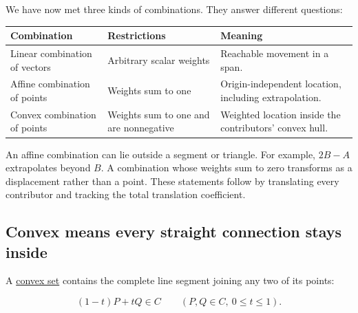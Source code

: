 We have now met three kinds of combinations. They answer different questions:

{\def\LTcaptype{none} %
\begin{longtable}[]{@{}
  >{\raggedright\arraybackslash}p{}
  >{\raggedright\arraybackslash}p{}
  >{\raggedright\arraybackslash}p{}@{}}
\toprule\noalign{}
\begin{minipage}[b]{\linewidth}\raggedright
Combination
\end{minipage} & \begin{minipage}[b]{\linewidth}\raggedright
Restrictions
\end{minipage} & \begin{minipage}[b]{\linewidth}\raggedright
Meaning
\end{minipage} \\
\midrule\noalign{}
\endhead
\bottomrule\noalign{}
\endlastfoot
Linear combination of vectors & Arbitrary scalar weights & Reachable movement in a span. \\
Affine combination of points & Weights sum to one & Origin-independent location, including extrapolation. \\
Convex combination of points & Weights sum to one and are nonnegative & Weighted location inside the contributors' convex hull. \\
\end{longtable}
}

An affine combination can lie outside a segment or triangle. For example, \(2B-A\) extrapolates beyond \(B\). A combination whose weights sum to zero transforms as a displacement rather than a point. These statements follow by translating every contributor and tracking the total translation coefficient.

\subsection{Convex means every straight connection stays inside}\label{01-foundations-i-ch018-convex-means-every-straight-connection-stays-inside}

A \hyperref[01-foundations-i-ch018-weighted-points-lead-from-affine-geometry-to-collision-shapes]{convex set} contains the complete line segment joining any two of its points:

\[
(1-t)P+tQ\in C\qquad(P,Q\in C,\ 0\le t\le1).
\]


